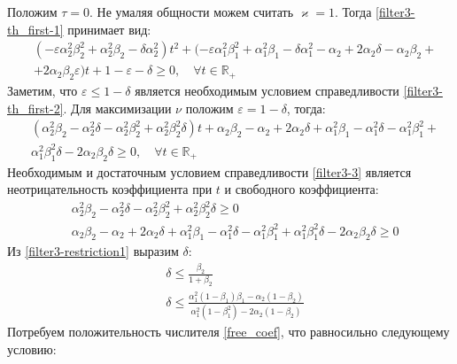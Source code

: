 \documentclass[a4paper,article,14pt]{extarticle}
\begin{document}
Положим $\tau = 0$. Не умаляя общности можем считать $\varkappa = 1$. Тогда \eqref{filter3-th_first-1} принимает вид:
 \begin{equation}\label{filter3-th_first-2}
 \begin{aligned}
&(-\varepsilon\alpha_2^2\beta_2^2 + \alpha_2^2\beta_2 - \delta\alpha_2^2)t^2 + (-\varepsilon\alpha_1^2\beta_1^2 + \alpha_1^2\beta_1 - \delta\alpha_1^2 - \alpha_2 + 2\alpha_2\delta - \alpha_2\beta_2 +\\
&+ 2\alpha_2\beta_2\varepsilon)t + 1 - \varepsilon - \delta \geqslant 0, \quad \forall t \in \mathbb{R_+}
 \end{aligned}
\end{equation}
Заметим, что $\varepsilon \leqslant 1 - \delta$ является необходимым условием справедливости \eqref{filter3-th_first-2}. Для максимизации $\nu$ положим $\varepsilon = 1-\delta$, тогда:
 \begin{equation}\label{filter3-3}
 \begin{aligned}
&(\alpha_2^2\beta_2 - \alpha_2^2\delta - \alpha_2^2\beta_2^2 + \alpha_2^2\beta_2^2\delta)t + \alpha_2\beta_2 - \alpha_2 + 2\alpha_2\delta + \alpha_1^2\beta_1 - \alpha_1^2\delta - \alpha_1^2\beta_1^2 + \\
&\alpha_1^2\beta_1^2\delta - 2\alpha_2\beta_2\delta \geqslant 0, \quad \forall t \in \mathbb{R_+}
 \end{aligned}
\end{equation}
Необходимым и достаточным условием справедливости \eqref{filter3-3} является неотрицательность коэффициента при $t$ и свободного коэффициента:
 \begin{equation}\label{filter3-restriction1}
 \begin{aligned}
&\alpha_2^2\beta_2 - \alpha_2^2\delta - \alpha_2^2\beta_2^2 + \alpha_2^2\beta_2^2\delta \geqslant 0\\ 
&\alpha_2\beta_2 - \alpha_2 + 2\alpha_2\delta + \alpha_1^2\beta_1 - \alpha_1^2\delta - \alpha_1^2\beta_1^2 + \alpha_1^2\beta_1^2\delta - 2\alpha_2\beta_2\delta \geqslant 0
 \end{aligned}
\end{equation}
Из \eqref{filter3-restriction1} выразим $\delta$:
 \begin{align}
&\delta \leqslant \frac{\beta_2}{1+\beta_2} \label{t_coef}\\
&\delta \leqslant \frac{\alpha_1^2(1-\beta_1)\beta_1 - \alpha_2(1-\beta_2)}{\alpha_1^2(1-\beta_1^2) - 2\alpha_2(1-\beta_2)} \label{free_coef}
 \end{align}
 Потребуем положительность числителя \eqref{free_coef}, что равносильно следующему условию:
\end{document}
